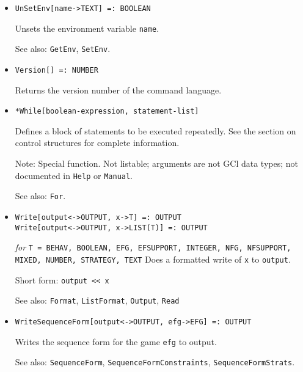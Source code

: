 \begin{itemize}
\item{}
\protect \large \begin{verbatim}
UnSetEnv[name->TEXT] =: BOOLEAN 
\end{verbatim} \normalsize

\bd
Unsets the environment variable \verb+name+.
\item [See also:] \verb+GetEnv+, \verb+SetEnv+.
\ed


\item{}
\protect \large \begin{verbatim}
Version[] =: NUMBER 
\end{verbatim} \normalsize

\bd
Returns the version number of the command language.
\ed



\item{} 
\protect \large \begin{verbatim}
*While[boolean-expression, statement-list]
\end{verbatim} \normalsize
  
\bd
Defines a block of statements to be executed repeatedly.
See the section on control structures for complete information.
\item [Note:] Special function.  Not listable; arguments are not GCl
data types; not documented in \verb+Help+ or \verb+Manual+.  
\item
[See also:] \verb+For+.
\ed

\item{}
\protect \large \begin{verbatim}
Write[output<->OUTPUT, x->T] =: OUTPUT  
Write[output<->OUTPUT, x->LIST(T)] =: OUTPUT
\end{verbatim}\normalsize

{\it for} {\tt T = BEHAV, BOOLEAN, EFG, EFSUPPORT, INTEGER,
NFG, NFSUPPORT, MIXED, NUMBER, STRATEGY, TEXT}
\bd
Does a formatted write of \verb+x+ to \verb+output+.
\item [Short form:] \verb+output << x+
\item [See also:] \verb+Format+, \verb+ListFormat+, \verb+Output+, \verb+Read+
\ed

\item{}
\protect \large \begin{verbatim} 
WriteSequenceForm[output<->OUTPUT, efg->EFG] =: OUTPUT
\end{verbatim}\normalsize

\bd 
Writes the sequence form for the game \verb+efg+ to output.  
\item [See also:] \verb+SequenceForm+,
\verb+SequenceFormConstraints+, \verb+SequenceFormStrats+.
\ed




\end{itemize}

